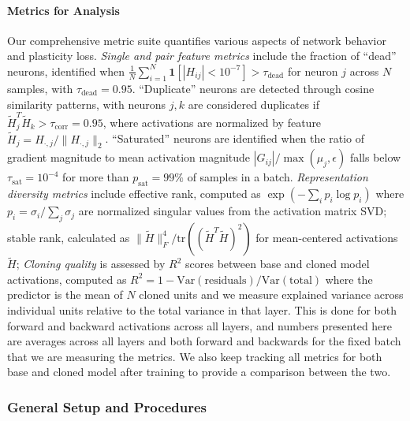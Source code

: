 \documentclass{article}
\numberwithin{figure}{section}
\begin{document}
\paragraph{Metrics for Analysis} Our comprehensive metric suite quantifies various aspects of network behavior and plasticity loss. \emph{Single and pair feature metrics} include the fraction of ``dead'' neurons, identified when $\frac{1}{N} \sum_{i=1}^{N} \mathbf{1}[|H_{ij}| < 10^{-7}] > \tau_{\text{dead}}$ for neuron $j$ across $N$ samples, with $\tau_{\text{dead}} = 0.95$. ``Duplicate'' neurons are detected through cosine similarity patterns, with neurons $j,k$ are considered duplicates if $\tilde{H}_j^T \tilde{H}_k > \tau_{\text{corr}} = 0.95$, where  activations are normalized by feature $\tilde{H}_j = H_{\cdot,j}/\|H_{\cdot,j}\|_2$. ``Saturated'' neurons are identified when the ratio of gradient magnitude to mean activation magnitude $|G_{ij}|/\max(\mu_j, \epsilon)$ falls below $\tau_{\text{sat}} = 10^{-4}$ for more than $p_{\text{sat}} = 99\%$ of samples in a batch. \emph{Representation diversity metrics} include effective rank, computed as $\exp(-\sum_i p_i \log p_i)$ where $p_i = \sigma_i/\sum_j \sigma_j$ are normalized singular values from the activation matrix SVD; stable rank, calculated as $\|\tilde{H}\|_F^4/\text{tr}((\tilde{H}^T\tilde{H})^2)$ for mean-centered activations $\tilde{H}$;  \emph{Cloning quality} is assessed by $R^2$ scores between base and cloned model activations, computed as $R^2 = 1 - \text{Var}(\text{residuals})/\text{Var}(\text{total})$ where the predictor is the mean of $N$ cloned units and we measure explained variance across individual units relative to the total variance in that layer. This is done for both forward and backward activations across all layers, and numbers presented here are averages across all layers and both forward and backwards for the fixed batch that we are measuring the metrics. We also keep tracking all metrics for both base and cloned model after training to provide a comparison between the two. 

\subsubsection{General Setup and Procedures}
\label{subsec:general_setup}
\end{document}
